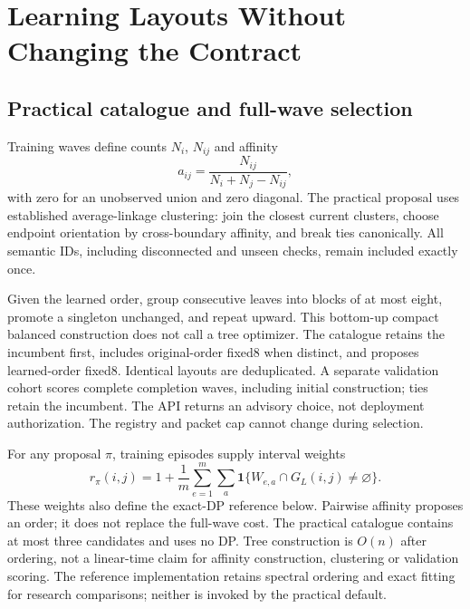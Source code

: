 \section{Learning Layouts Without Changing the Contract}\label{sec:compiler}
\subsection{Practical catalogue and full-wave selection}\label{sec:catalogue}
Training waves define counts $N_i$, $N_{ij}$ and affinity
\begin{equation}a_{ij}=\frac{N_{ij}}{N_i+N_j-N_{ij}},\label{eq:affinity}\end{equation}
with zero for an unobserved union and zero diagonal. The practical proposal uses
established average-linkage clustering: join the closest current clusters,
choose endpoint orientation by cross-boundary affinity, and break ties
canonically. All semantic IDs, including disconnected and unseen checks, remain
included exactly once.

Given the learned order, group consecutive leaves into blocks of at most eight,
promote a singleton unchanged, and repeat upward. This bottom-up compact balanced
construction does not call a tree optimizer. The catalogue retains the incumbent
first, includes original-order fixed8 when distinct, and proposes learned-order
fixed8. Identical layouts are deduplicated. A separate validation cohort scores
complete completion waves, including initial construction; ties retain the
incumbent. The API returns an advisory choice, not deployment authorization. The
registry and packet cap cannot change during selection.

For any proposal $\pi$, training episodes supply interval weights
\begin{equation}r_\pi(i,j)=1+\frac{1}{m}\sum_{e=1}^{m}\sum_{a}\mathbf 1\{W_{e,a}\cap G_L(i,j)\ne\varnothing\}.\label{eq:weights}\end{equation}
These weights also define the exact-DP reference below. Pairwise affinity
proposes an order; it does not replace the full-wave cost. The practical
catalogue contains at most three candidates and uses no DP. Tree construction is
$O(n)$ after ordering, not a linear-time claim for affinity construction,
clustering or validation scoring. The reference implementation retains spectral
ordering and exact fitting for research comparisons; neither is invoked by the
practical default.

